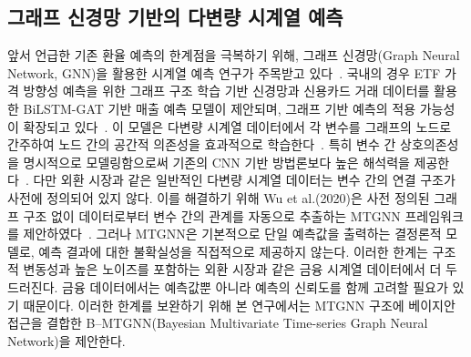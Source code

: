 \subsection{그래프 신경망 기반의 다변량 시계열 예측}
앞서 언급한 기존 환율 예측의 한계점을 극복하기 위해, 그래프 신경망(Graph Neural Network, GNN)을 활용한 시계열 예측 연구가 주목받고 있다~\cite{Wu2020MTGNN,Cao2020StemGNN}. 국내의 경우 ETF 가격 방향성 예측을 위한 그래프 구조 학습 기반 신경망과 신용카드 거래 데이터를 활용한 BiLSTM-GAT 기반 매출 예측 모델이 제안되며, 그래프 기반 예측의 적용 가능성이 확장되고 있다~\cite{Jo2024ETFGraph,Jung2024BiLSTMGAT}. 이 모델은 다변량 시계열 데이터에서 각 변수를 그래프의 노드로 간주하여 노드 간의 공간적 의존성을 효과적으로 학습한다~\cite{Kipf2017GCN,Wu2019GraphWaveNet}. 특히 변수 간 상호의존성을 명시적으로 모델링함으로써 기존의 CNN 기반 방법론보다 높은 해석력을 제공한다~\cite{Velickovic2018GAT}. 다만 외환 시장과 같은 일반적인 다변량 시계열 데이터는 변수 간의 연결 구조가 사전에 정의되어 있지 않다. 이를 해결하기 위해 Wu et al.(2020)은 사전 정의된 그래프 구조 없이 데이터로부터 변수 간의 관계를 자동으로 추출하는 MTGNN 프레임워크를 제안하였다~\cite{Wu2020MTGNN}. 그러나 MTGNN은 기본적으로 단일 예측값을 출력하는 결정론적 모델로, 예측 결과에 대한 불확실성을 직접적으로 제공하지 않는다. 이러한 한계는 구조적 변동성과 높은 노이즈를 포함하는 외환 시장과 같은 금융 시계열 데이터에서 더 두드러진다. 금융 데이터에서는 예측값뿐 아니라 예측의 신뢰도를 함께 고려할 필요가 있기 때문이다. 이러한 한계를 보완하기 위해 본 연구에서는 MTGNN 구조에 베이지안 접근을 결합한 B--MTGNN(Bayesian Multivariate Time-series Graph Neural Network)을 제안한다.  

